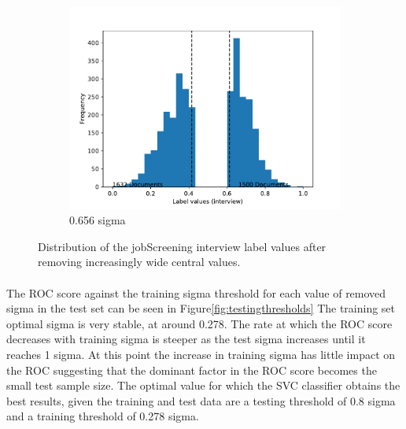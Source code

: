 \documentclass[12pt,a4paper]{report}
\begin{document}
\begin{figure}
\begin{subfigure}[b]{0.32\textwidth}
    \end{subfigure}
    ~ %
    \begin{subfigure}[b]{0.32\textwidth}
        \includegraphics[width=\textwidth]{imgs/training_histogram/0656311_training_histogram.pdf}
        \caption{0.656 sigma}
        \label{fig:0.656 sigma}
    \end{subfigure}
    \caption{Distribution of the jobScreening interview label values after removing increasingly wide central values.}\label{fig:thresholddeletion}
\end{figure}

\paragraph{} The ROC score against the training sigma threshold for each value of removed sigma in the test set can be seen in Figure\ref{fig:testingthresholds} The training set optimal sigma is very stable, at around 0.278. The rate at which the ROC score decreases with training sigma is steeper as the test sigma increases until it reaches 1 sigma. At this point the increase in training sigma has little impact on the ROC suggesting that the dominant factor in the ROC score becomes the small test sample size. The optimal value for which the SVC classifier obtains the best results, given the training and test data are a testing threshold of 0.8 sigma and a training threshold of 0.278 sigma.
\end{document}
